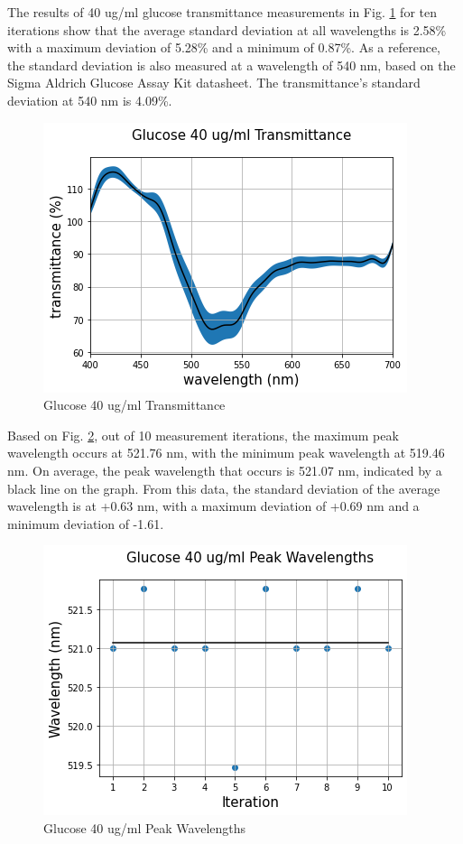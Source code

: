 \documentclass[conference]{IEEEtran}
\begin{document}
The results of 40 ug/ml glucose transmittance measurements in Fig. \ref{glucose_transmittance_all} for ten iterations show that the average standard deviation at all wavelengths is 2.58\% with a maximum deviation of 5.28\% and a minimum of 0.87\%.
As a reference, the standard deviation is also measured at a wavelength of 540 nm, based on the Sigma Aldrich Glucose Assay Kit datasheet.
The transmittance's standard deviation at 540 nm is 4.09\%. 

\begin{figure}[htbp]
    \centerline{\includegraphics[scale=0.5]{glucosetransmittanceALL.png}}
    \caption{Glucose 40 ug/ml Transmittance}
    \label{glucose_transmittance_all}
    \end{figure}

Based on Fig. \ref{glucose_peak_wavelength}, out of 10 measurement iterations, the maximum peak wavelength occurs at 521.76 nm, with the minimum peak wavelength at 519.46 nm.
On average, the peak wavelength that occurs is 521.07 nm, indicated by a black line on the graph.
From this data, the standard deviation of the average wavelength is at +0.63 nm, with a maximum deviation of +0.69 nm and a minimum deviation of -1.61.

\begin{figure}[htbp]
    \centerline{\includegraphics[scale=0.5]{glucose_peakwavelength.png}}
    \caption{Glucose 40 ug/ml Peak Wavelengths}
    \label{glucose_peak_wavelength}
    \end{figure}
\end{document}
